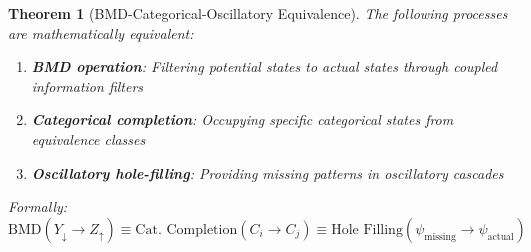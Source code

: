 \documentclass[11pt]{article}
\newtheorem{theorem}{Theorem}[section]
\theoremstyle{remark}
\begin{document}
\begin{theorem}[BMD-Categorical-Oscillatory Equivalence]
\label{thm:triple_equivalence}
The following processes are mathematically equivalent:
\begin{enumerate}
\item \textbf{BMD operation}: Filtering potential states to actual states through coupled information filters
\item \textbf{Categorical completion}: Occupying specific categorical states from equivalence classes  
\item \textbf{Oscillatory hole-filling}: Providing missing patterns in oscillatory cascades
\end{enumerate}

Formally:
\begin{equation}
\text{BMD}(Y_{\downarrow} \to Z_{\uparrow}) \equiv \text{Cat. Completion}(C_i \to C_j) \equiv \text{Hole Filling}(\psi_{\text{missing}} \to \psi_{\text{actual}})
\end{equation}
\end{theorem}
\end{document}
